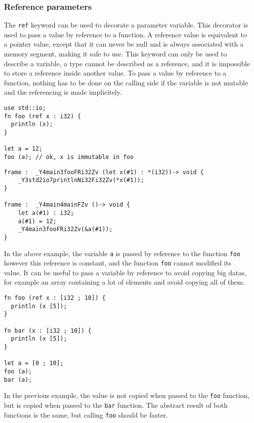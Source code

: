 \subsubsection {Reference parameters}

The \texttt{ref} keyword can be used to decorate a parameter variable. This
decorator is used to pass a value by reference to a function. A reference value
is equivalent to a pointer value, except that it can never be null and is always
associated with a memory segment, making it safe to use. This keyword can only
be used to describe a variable, a type cannot be described as a reference, and
it is impossible to store a reference inside another value. To pass a value by
reference to a function, nothing has to be done on the calling side if the
variable is not mutable and the referencing is made implicitely.

\begin{lstlisting}[style=coloredverbatim]
use std::io;
fn foo (ref x : i32) {
  println (x);
}

let a = 12;
foo (a); // ok, x is immutable in foo
\end{lstlisting}

\begin{lstlisting}[style=intermediateVerb]
frame :  _Y4main3fooFRi32Zv (let x(#1) : *(i32))-> void {
    _Y3std2io7printlnNi32Fi32Zv(*x(#1));
}

frame :  _Y4main4mainFZv ()-> void {
    let a(#1) : i32;
    a(#1) = 12;
    _Y4main3fooFRi32Zv(&a(#1));
}
\end{lstlisting}

In the above example, the variable \texttt{a} is passed by reference to the
function \texttt{foo} however this reference is constant, and the function
\texttt{foo} cannot modified its value. It can be useful to pass a variable by
reference to avoid copying big datas, for example an array containing a lot of
elements and avoid copying all of them.

\begin{lstlisting}[style=coloredverbatim]
fn foo (ref x : [i32 ; 10]) {
  println (x [5]);
}

fn bar (x : [i32 ; 10]) {
  println (x [5]);
}

let a = [0 ; 10];
foo (a);
bar (a);
\end{lstlisting}

In the previous example, the value is not copied when passed to the \texttt{foo}
function, but is copied when passed to the \texttt{bar} function. The abstract
result of both functions is the same, but calling \texttt{foo} should be faster.

